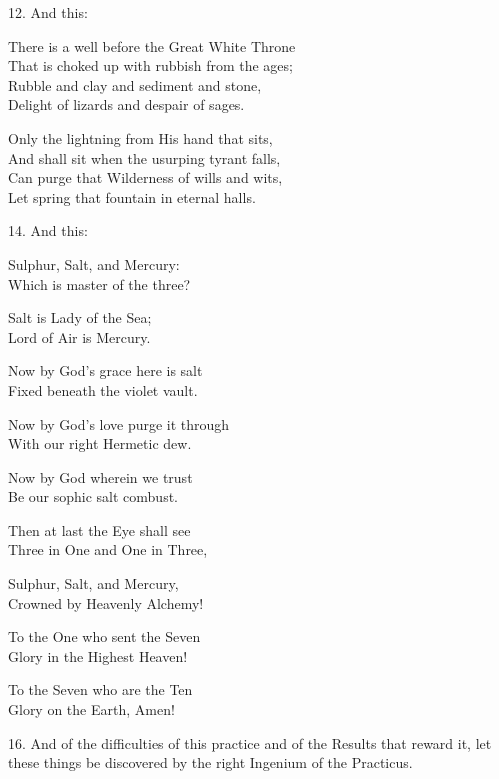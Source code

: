12. And this:
\begin{tightverse}
 There is a well before the Great White Throne \\
That is choked up with rubbish from the ages; \\
Rubble and clay and sediment and stone, \\
Delight of lizards and despair of sages.

Only the lightning from His hand that sits, \\
And shall sit when the usurping tyrant falls, \\
Can purge that Wilderness of wills and wits, \\
Let spring that fountain in eternal halls. \\
\end{tightverse}

14. And this:
\begin{tightverse}
 Sulphur, Salt, and Mercury: \\
 Which is master of the three?

 Salt is Lady of the Sea; \\
 Lord of Air is Mercury.

 Now by God’s grace here is salt \\
 Fixed beneath the violet vault.

 Now by God’s love purge it through \\
 With our right Hermetic dew.

 Now by God wherein we trust \\
 Be our sophic salt combust.

 Then at last the Eye shall see \\
 Three in One and One in Three,

 Sulphur, Salt, and Mercury, \\
 Crowned by Heavenly Alchemy!

 To the One who sent the Seven \\
 Glory in the Highest Heaven!

 To the Seven who are the Ten \\
 Glory on the Earth, Amen!
\end{tightverse}

16. And of the difficulties of this practice and of the Results that reward it, let these things be discovered by the right Ingenium of the Practicus.

